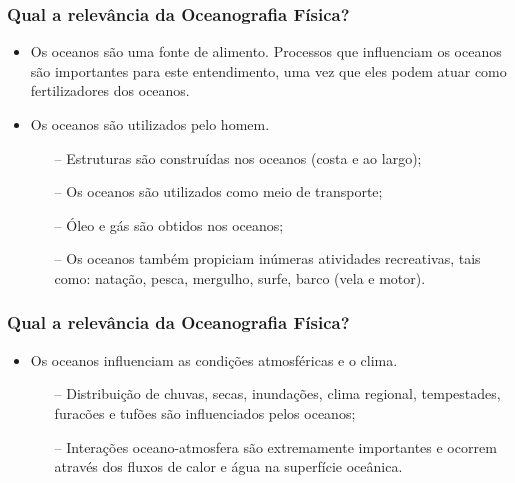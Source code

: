 \documentclass[14pt,xcolor=dvipsnames]{beamer}
\begin{document}
\begin{frame}
    \frametitle{Qual a relevância da Oceanografia Física?}
    \begin{itemize}[<+-| alert@+>]
        \item Os oceanos são uma fonte de alimento.  Processos que influenciam
              os oceanos são importantes para este entendimento, uma vez que
              eles podem atuar como fertilizadores dos oceanos.
        \item Os oceanos são utilizados pelo homem.
            \begin{enumerate}[<+-| alert@+>]
                \item[--] Estruturas são construídas nos oceanos (costa e ao largo);
                \item[--] Os oceanos são utilizados como meio de transporte;
                \item[--] Óleo e gás são obtidos nos oceanos;
                \item[--] Os oceanos também propiciam inúmeras atividades recreativas,
                          tais como: natação, pesca, mergulho, surfe, barco (vela e motor).

            \end{enumerate}
    \end{itemize}
\end{frame}

\begin{frame}
    \frametitle{Qual a relevância da Oceanografia Física?}
    \begin{itemize}[<+-| alert@+>]
        \item Os oceanos influenciam as condições atmosféricas e o clima.
            \begin{enumerate}[<+-| alert@+>]
                \item[--] Distribuição de chuvas, secas, inundações, clima regional,
                          tempestades, furacões e tufões são influenciados pelos oceanos;
                \item[--] Interações oceano-atmosfera são extremamente importantes e
                          ocorrem através dos fluxos de calor e água na superfície oceânica.
            \end{enumerate}
    \end{itemize}
\end{frame}
\end{document}
